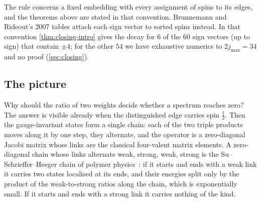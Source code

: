 The rule concerns a fixed embedding with every assignment of spins to its edges, and
the theorems above are stated in that convention. Brunnemann and Rideout's 2007
tables attach each sign vector to sorted spins instead. In that convention
\cref{thm:closing-intro} gives the decay for $6$ of the $60$ sign vectors (up to
sign) that contain $\pm4$; for the other $54$ we have exhaustive numerics to
$2j_{\max}=34$ and no proof (\cref{sec:closing}).

\subsection{The picture}

Why should the ratio of two weights decide whether a spectrum reaches zero? The
answer is visible already when the distinguished edge carries spin $\frac12$.
Then the gauge-invariant states form a single chain: each of the two triple
products moves along it by one step, they alternate, and the operator is a
zero-diagonal Jacobi matrix whose links are the classical four-valent matrix
elements. A zero-diagonal chain whose links alternate weak, strong, weak, strong
is the Su--Schrieffer--Heeger chain of polymer physics~\cite{SSH1979}: if it starts
and ends with a weak link it carries two states localised at its ends, and their
energies split only by the product of the weak-to-strong ratios along the chain,
which is exponentially small. If it starts and ends with a strong link it carries
nothing of the kind.

